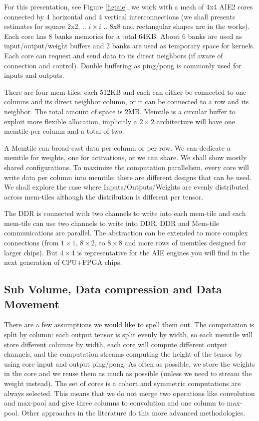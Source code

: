 \documentclass[conference]{IEEEtran}
\begin{document}
For this presentation, see Figure \ref{fig:aie}, we work with a mesh
of 4x4 AIE2 cores connected by 4 horizontal and 4 vertical
interconnections (we shall presents estimates for square 2x2,
.. $i\times i$ .. 8x8 and rectangular shapes are in the works). Each
core has 8 banks memories for a total 64KB. About 6 banks are used as
input/output/weight buffers and 2 banks are used as temporary space
for kernels. Each core can request and send data to its direct
neighbors (if aware of connection and control). Double buffering as
ping/pong is commonly used for inputs and outputs.

There are four mem-tiles: each 512KB and each can either be connected
to one columns and its direct neighbor column, or it can be connected
to a row and its neighbor. The total amount of space is 2MB. Memtile
is a circular buffer to exploit more flexible allocation, implicitly a
$2 \times 2$ architecture will have one memtile per column and a total
of two.

A Memtile can broad-cast data per column or per row. We can dedicate a
memtile for weights, one for activations, or we can share. We shall
show mostly shared configurations. To maximize the computation
parallelism, every core will write data per column into memtile: there
are different designs that can be used. We shall explore the case
where Inputs/Outputs/Weights are evenly distributed across mem-tiles
although the distribution is different per tensor.

The DDR is connected with two channels to write into each mem-tile and
each mem-tile can use two channels to write into DDR. DDR and Mem-tile
communications are parallel.  The abstraction can be extended to more
complex connections (from $1\times 1$, $8\times 2$, to $8\times 8$ and
more rows of memtiles designed for larger chips). But $4\times 4$ is
representative for the AIE engines you will find in the next
generation of CPU+FPGA chips.


\subsection{Sub Volume, Data compression and Data Movement}
There are a few assumptions we would like to spell them out. The
computation is split by column: each output tensor is split evenly by
width, so each memtile will store different columns by width, each
core will compute different output channels, and the computation
streams computing the height of the tensor by using core input and
output ping/pong. As often as possible, we store the weights in the
core and we reuse them as much as possible (unless we need to stream
the weight instead). The set of cores is a cohort and symmetric
computations are always selected. This means that we do not merge two
operations like convolution and max-pool and give three columns to
convolution and one column to max-pool. Other approaches in the
literature do this more advanced methodologies.
\end{document}
